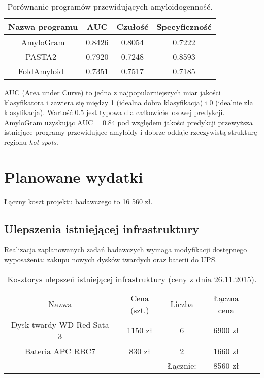 \documentclass{article}
\begin{document}
\begin{table}[!htbp]
\centering
\caption*{Porównanie programów przewidujących amyloidogenność.} 
\begin{tabular}{c|c|c|c}
  \hline
Nazwa programu & AUC & Czułość & Specyficzność \\ 
  \hline
AmyloGram & 0.8426 & 0.8054 & 0.7222 \\ 
PASTA2~\citep{walsh_pasta_2014} & 0.7920 & 0.7248 & 0.8593 \\ 
  FoldAmyloid~\citep{Garbuzynskiy2010} & 0.7351 & 0.7517 & 0.7185 \\ 
   \hline
\end{tabular}
\end{table}

AUC (Area under Curve) to jedna z najpopularniejszych miar jakości klasyfikatora i zawiera się między 1 (idealna dobra klasyfikacja) i 0 (idealnie zła klasyfikacja). Wartość 0.5 jest typowa dla całkowicie losowej predykcji. AmyloGram uzyskując $\textrm{AUC} = 0.84$ pod względem jakości predykcji przewyższa istniejące programy przewidujące amyloidy i dobrze oddaje rzeczywistą strukturę regionu \textit{hot-spots}.



\section{Planowane wydatki}

Łączny koszt projektu badawczego to 16 560 zł.

\subsection{Ulepszenia istniejącej infrastruktury}

Realizacja zaplanowanych zadań badawczych wymaga modyfikacji dostępnego wyposażenia: zakupu nowych dysków twardych oraz baterii do UPS.

\begin{table}[!htbp]
\centering
\caption*{Kosztorys ulepszeń istniejącej infrastruktury (ceny z dnia 26.11.2015).}
\begin{tabular}{ccccc}
\cline{1-4}
\multicolumn{1}{|c|}{Nazwa}                     & \multicolumn{1}{c|}{Cena (szt.)} & \multicolumn{1}{c|}{Liczba} & \multicolumn{1}{c|}{Łączna cena} &  \\ \cline{1-4}
\multicolumn{1}{|c|}{Dysk twardy WD Red Sata 3} & \multicolumn{1}{c|}{1150 zł}     & \multicolumn{1}{c|}{6}      & \multicolumn{1}{c|}{6900 zł}     &  \\ \cline{1-4}
\multicolumn{1}{|c|}{Bateria APC RBC7}          & \multicolumn{1}{c|}{830 zł}      & \multicolumn{1}{c|}{2}      & \multicolumn{1}{c|}{1660 zł}     &  \\ \cline{1-4}
                                                &                                  & Łącznie:                    & 8560 zł                          & 
\end{tabular}
\end{table}
\end{document}
